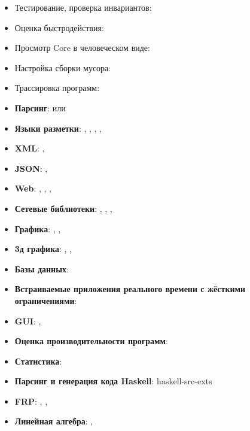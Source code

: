 
\begin{itemize}

\item Тестирование, проверка инвариантов: 

\item Оценка быстродействия: 

\item Просмотр Core в человеческом виде: 

\item Настройка сборки мусора: 

\item Трассировка программ: 

\end{itemize}


\begin{itemize}

\item \textbf{Парсинг}:  или 
\item \textbf{Языки разметки}: , , , 
        , 
\item \textbf{XML}: , 
\item \textbf{JSON}: , 
\item \textbf{Web}: , , , 
\item \textbf{Сетевые библиотеки}: , , , 

\item \textbf{Графика}: , , 
\item \textbf{3д графика}: , ,  

\item \textbf{Базы данных}: 
\item \textbf{Встраиваемые приложения реального времени 
    с жёсткими ограничениями}: 

\item \textbf{GUI}: , 

\item \textbf{Оценка производительности программ}: 

\item \textbf{Статистика}: 

\item \textbf{Парсинг и генерация кода Haskell}: haskell-src-exts

\item \textbf{FRP}: , , 

\item \textbf{Линейная алгебра}: , 

\end{itemize}

